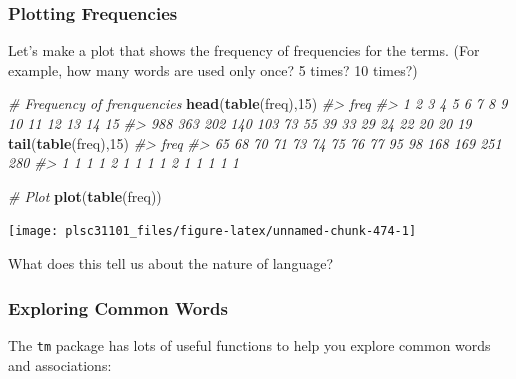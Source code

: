 \documentclass[
]{book}
\newenvironment{Shaded}{\begin{snugshade}}{\end{snugshade}}
\newcommand{\CommentTok}[1]{\textcolor[rgb]{0.56,0.35,0.01}{\textit{#1}}}
\newcommand{\DecValTok}[1]{\textcolor[rgb]{0.00,0.00,0.81}{#1}}
\newcommand{\KeywordTok}[1]{\textcolor[rgb]{0.13,0.29,0.53}{\textbf{#1}}}
\newcommand{\NormalTok}[1]{#1}
\begin{document}
\hypertarget{plotting-frequencies}{%
\subsubsection*{Plotting Frequencies}\label{plotting-frequencies}}

Let's make a plot that shows the frequency of frequencies for the terms. (For example, how many words are used only once? 5 times? 10 times?)

\begin{Shaded}
\begin{Highlighting}[]
\CommentTok{# Frequency of frenquencies}
\KeywordTok{head}\NormalTok{(}\KeywordTok{table}\NormalTok{(freq),}\DecValTok{15}\NormalTok{)}
\CommentTok{#> freq}
\CommentTok{#>   1   2   3   4   5   6   7   8   9  10  11  12  13  14  15 }
\CommentTok{#> 988 363 202 140 103  73  55  39  33  29  24  22  20  20  19}
\KeywordTok{tail}\NormalTok{(}\KeywordTok{table}\NormalTok{(freq),}\DecValTok{15}\NormalTok{)}
\CommentTok{#> freq}
\CommentTok{#>  65  68  70  71  73  74  75  76  77  95  98 168 169 251 280 }
\CommentTok{#>   1   1   1   1   2   1   1   1   1   2   1   1   1   1   1}

\CommentTok{# Plot}
\KeywordTok{plot}\NormalTok{(}\KeywordTok{table}\NormalTok{(freq))}
\end{Highlighting}
\end{Shaded}

\begin{center}\texttt{[image: plsc31101\_files/figure-latex/unnamed-chunk-474-1]} \end{center}

What does this tell us about the nature of language?

\hypertarget{exploring-common-words}{%
\subsubsection*{Exploring Common Words}\label{exploring-common-words}}

The \texttt{tm} package has lots of useful functions to help you explore common words and associations:
\end{document}
